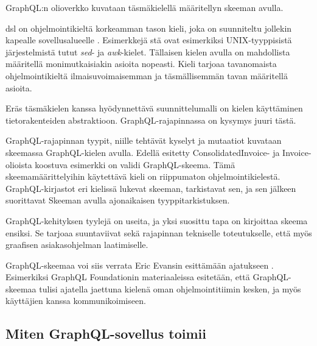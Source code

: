 GraphQL:n olioverkko kuvataan täsmäkielellä määritellyn skeeman avulla.

\Gls{dsl} on ohjelmointikieltä korkeamman tason kieli, joka on
suunniteltu jollekin kapealle sovellusalueelle \cite{landin1966next}.
Esimerkkejä stä ovat esimerkiksi UNIX-tyyppisistä
järjestelmistä tutut \emph{sed}- ja \emph{awk}-kielet. Tällaisen kielen
avulla on mahdollista määritellä monimutkaisiakin asioita nopeasti.
\cite{Raymond2003} Kieli tarjoaa tavanomaista ohjelmointikieltä
ilmaisuvoimaisemman ja täsmällisemmän tavan määritellä asioita.

Eräs täsmäkielen kanssa hyödynnettävä suunnittelumalli on kielen
käyttäminen tietorakenteiden abstraktioon.\cite{Spi00b}
GraphQL-rajapinnassa on kysymys juuri tästä.

GraphQL-rajapinnan tyypit, niille tehtävät kyselyt ja mutaatiot kuvataan
skeemassa GraphQL-kielen avulla. Edellä esitetty ConsolidatedInvoice- ja
Invoice-olioista koostuva esimerkki on validi GraphQL-skeema. Tämä
skeemamäärittelyihin käytettävä kieli on riippumaton
ohjelmointikielestä. GraphQL-kirjastot eri kielissä lukevat skeeman,
tarkistavat sen, ja sen jälkeen suorittavat Skeeman avulla ajonaikaisen
tyyppitarkistuksen.

GraphQL-kehityksen tyylejä on useita, ja yksi suosittu tapa on
kirjoittaa skeema ensiksi. Se tarjoaa suuntaviivat sekä rajapinnan
tekniselle toteutukselle, että myös graafisen asiakasohjelman
laatimiselle.\cites{SchemaDriven2017Nov}{SchemaDrivenDesign2021Jul}

GraphQL-skeemaa voi siis verrata Eric Evansin esittämään ajatukseen
. Esimerkiksi GraphQL
Foundationin materiaaleissa esitetään, että GraphQL-skeemaa tulisi
ajatella jaettuna kielenä oman ohjelmointitiimin kesken, ja myös
käyttäjien kanssa kommunikoimiseen.\cite{thinkingInGraphs}

\hypertarget{miten-graphql-sovellus-toimii}{%
\subsection{Miten GraphQL-sovellus
toimii}\label{miten-graphql-sovellus-toimii}}

